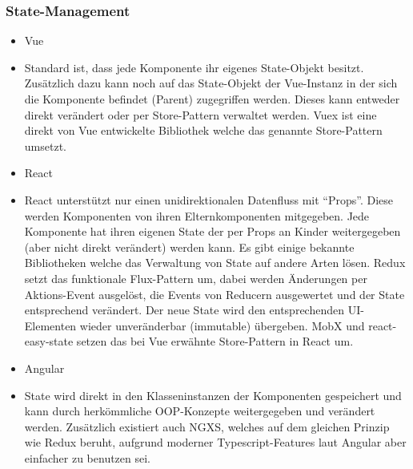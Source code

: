\subsubsection{State-Management}
\begin{itemize}
    \item{Vue}
    \item[] Standard ist, dass jede Komponente ihr eigenes State-Objekt besitzt. Zusätzlich dazu kann noch auf das State-Objekt der Vue-Instanz in der sich die Komponente befindet (Parent) zugegriffen werden. Dieses kann entweder direkt verändert oder per Store-Pattern  verwaltet werden. Vuex ist eine direkt von Vue entwickelte Bibliothek welche das genannte Store-Pattern umsetzt.
    \item{React}
    \item[] React unterstützt nur einen unidirektionalen Datenfluss mit ``Props''. Diese werden Komponenten von ihren Elternkomponenten mitgegeben. Jede Komponente hat ihren eigenen State der per Props an Kinder weitergegeben (aber nicht direkt verändert) werden kann. Es gibt einige bekannte Bibliotheken welche das Verwaltung von State auf andere Arten lösen. Redux setzt das funktionale Flux-Pattern um, dabei werden Änderungen per Aktions-Event ausgelöst, die Events von Reducern ausgewertet und der State entsprechend verändert. Der neue State wird den entsprechenden UI-Elementen wieder unveränderbar (immutable) übergeben. MobX und react-easy-state setzen das bei Vue erwähnte Store-Pattern in React um.
    \item{Angular}
    \item[] State wird direkt in den Klasseninstanzen der Komponenten gespeichert und kann durch herkömmliche OOP-Konzepte weitergegeben und verändert werden. Zusätzlich existiert auch NGXS, welches auf dem gleichen Prinzip wie Redux beruht, aufgrund moderner Typescript-Features laut Angular aber einfacher zu benutzen sei.
\end{itemize}

